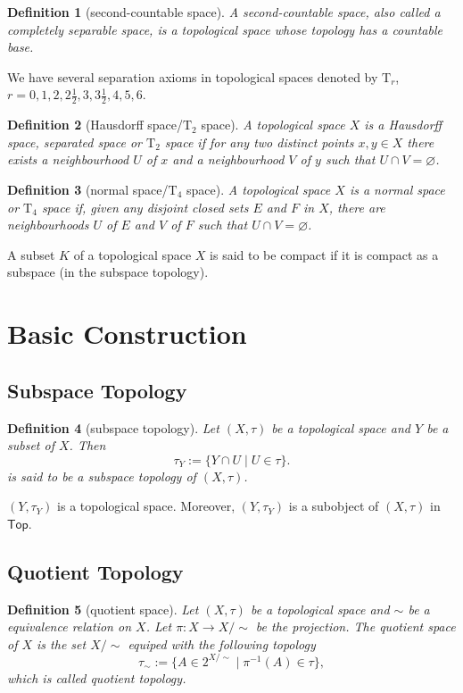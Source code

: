 \documentclass{report}
\newtheorem{definition}{Definition}[section]
\theoremstyle{nonumberplain}
\newcommand{\Top}{\mathsf{Top}}
\begin{document}
\begin{definition}[second-countable space]
	A \emph{second-countable} space, also called a completely separable space, is a topological space whose topology has a countable base.
\end{definition}

We have several separation axioms in topological spaces denoted by $\mathrm{T}_r$, $r=0,1,2,2\frac{1}{2},3,3\frac{1}{2},4,5,6$.
\begin{definition}[Hausdorff space/$\mathrm{T}_2$ space]
	A topological space $X$ is a \emph{Hausdorff space}, separated space or $\mathrm{T}_2$ space if for any two distinct points $x,y\in X$ there exists a neighbourhood $U$ of $x$ and a neighbourhood $V$ of $y$ such that $U\cap V=\varnothing$.
\end{definition}
\begin{definition}[normal space/$\mathrm{T}_4$ space]
	A topological space $X$ is a \emph{normal space} or $\mathrm{T}_4$ space if, given any disjoint closed sets $E$ and $F$ in $X$, there are neighbourhoods $U$ of $E$ and $V$ of $F$ such that $U\cap V=\varnothing$.
\end{definition}

A subset $K$ of a topological space $X$ is said to be compact if it is compact as a subspace (in the subspace topology).
\section{Basic Construction}
\subsection{Subspace Topology}
\begin{definition}[subspace topology]
	Let $(X,\tau)$ be a topological space and $Y$ be a subset of $X$. Then
	\[
		\tau_Y:=\{Y\cap U\mid U\in \tau\}.
	\]
	is said to be a \emph{subspace topology} of $(X,\tau)$.
\end{definition}
$(Y,\tau_Y)$ is a topological space. Moreover, $(Y,\tau_Y)$ is a subobject of $(X,\tau)$ in $\Top$. 

\subsection{Quotient Topology}
\begin{definition}[quotient space]
	Let $(X,\tau)$ be a topological space and $\sim$ be a equivalence relation on $X$. Let $\pi:X\to X/\sim$ be the projection.
	The \emph{quotient space} of $X$ is the set $X/\sim$ equiped with the following topology
	\[
		\tau_\sim:=\{A\in 2^{X/\sim}\mid \pi^{-1}(A)\in \tau\},
	\]
	which is called \emph{quotient topology}.
\end{definition}
\end{document}
